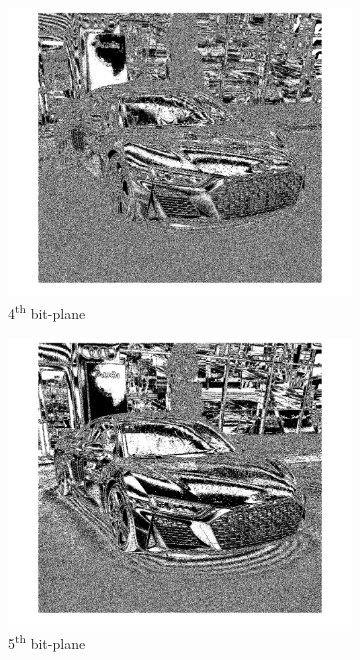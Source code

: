 \documentclass[conference]{IEEEtran}
\begin{document}
\begin{figure}[h!]
\begin{subfigure}[b]{0.3\linewidth}
\includegraphics[width=\linewidth]{images/img7.jpg}
\caption{4\textsuperscript{th} bit-plane}
\end{subfigure}
\begin{subfigure}[b]{0.3\linewidth}
\includegraphics[width=\linewidth]{images/img8.jpg}
\caption{5\textsuperscript{th} bit-plane}
\end{subfigure}
\begin{subfigure}[b]{0.3\linewidth}

\end{subfigure}
\end{figure}
\end{document}
